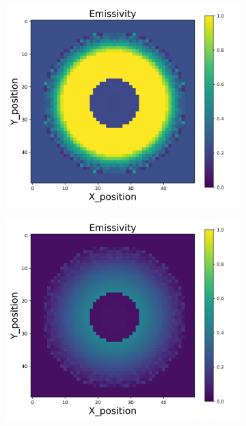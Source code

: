 {\begin{figure}[p]
\begin{minipage}{\textwidth}
\begin{subfigure}{0.325\textwidth}
        \end{subfigure}
    \end{minipage}\\
    \begin{minipage}{\textwidth}
        \centering
        \begin{subfigure}{0.325\textwidth}
            \centering
            \includegraphics[width=\textwidth]{figures/raw_data/25/lin_square/emi_cal.jpg}
        \end{subfigure}
        \begin{subfigure}{0.325\textwidth}
            \centering
            \includegraphics[width=\textwidth]{figures/raw_data/26/lin_square/emi_cal.jpg}

\end{subfigure}
\end{minipage}
\end{figure}}
